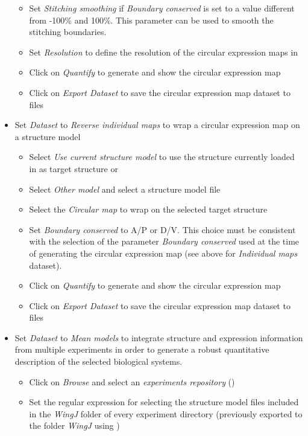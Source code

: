\begin{itemize}
\begin{itemize}
      \item Set \textit{Stitching smoothing} if \textit{Boundary conserved} is set to a value different from -100\% and 100\%. This parameter can be used to smooth the stitching boundaries.
      \item Set \textit{Resolution} to define the resolution of the circular expression maps in \px
      \item Click on \textit{Quantify} to generate and show the circular expression map
      \item Click on \textit{Export Dataset} to save the circular expression map dataset to files
      \end{itemize}
  \item Set \emph{Dataset} to \textit{Reverse individual maps} to wrap a circular expression map on a structure model
      \begin{itemize}
      \item Select \textit{Use current structure model} to use the structure currently loaded in \wingj as target structure or
      \item Select \textit{Other model} and select a structure model file
      \item Select the \textit{Circular map} to wrap on the selected target structure
      \item Set \textit{Boundary conserved} to A/P or D/V. This choice must be consistent with the selection of the parameter \textit{Boundary conserved} used at the time of generating the circular expression map (see above for \textit{Individual maps} dataset).
      \item Click on \textit{Quantify} to generate and show the circular expression map
      \item Click on \textit{Export Dataset} to save the circular expression map dataset to files
      \end{itemize}
  \item Set \emph{Dataset} to \textit{Mean models} to integrate structure and expression information from multiple experiments in order to generate a robust quantitative description of the selected biological systems.
      \begin{itemize}
	\item Click on \textit{Browse} and select an \textit{experiments repository} ()
	\item Set the regular expression for selecting the \wingj structure model files included in the \textit{WingJ} folder of every experiment directory (previously exported to the folder \textit{WingJ} using \wingj)

\end{itemize}
\end{itemize}
